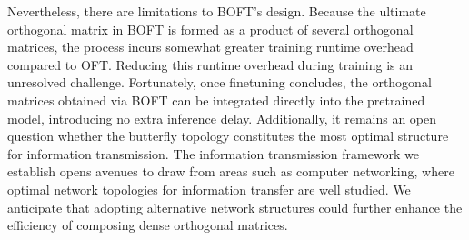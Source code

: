 Nevertheless, there are limitations to BOFT’s design. Because the ultimate orthogonal matrix in BOFT is formed as a product of several orthogonal matrices, the process incurs somewhat greater training runtime overhead compared to OFT. Reducing this runtime overhead during training is an unresolved challenge. Fortunately, once finetuning concludes, the orthogonal matrices obtained via BOFT can be integrated directly into the pretrained model, introducing no extra inference delay. Additionally, it remains an open question whether the butterfly topology constitutes the most optimal structure for information transmission. The information transmission framework we establish opens avenues to draw from areas such as computer networking, where optimal network topologies for information transfer are well studied. We anticipate that adopting alternative network structures could further enhance the efficiency of composing dense orthogonal matrices.

